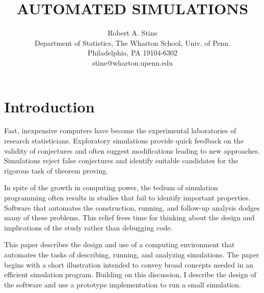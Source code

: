 

\setlength{\leftmargin}{0in}
\setlength{\rightmargin}{0in}
\setlength{\topmargin}{0in}
\setlength{\textheight}{9.in}
\setlength{\headheight}{0in}
\setlength{\headsep}{0in}

\setlength{\columnsep}{0.25in}

\setlength{\abovedisplayskip 0.1in}
\setlength{\belowdisplayskip 0.1in}


\title{AUTOMATED SIMULATIONS}
\author{Robert A. Stine\\
     Department of Statistics, The Wharton School, Univ. of Penn.\\
     Philadelphia, PA  19104-6302\\
		   stine@wharton.upenn.edu}
\date{}
\maketitle


\section{Introduction}

Fast, inexpensive computers have become the experimental laboratories
of research statisticians.  Exploratory simulations provide quick
feedback on the validity of conjectures and often suggest
modifications leading to new approaches. Simulations reject false
conjectures and identify suitable candidates for the rigorous task of
theorem proving. 

In spite of the growth in computing power, the tedium of simulation
programming often results in studies that fail to identify important
properties. Software that automates the construction, running, and
follow-up analysis dodges many of these problems.  This relief frees
time for thinking about the design and implications of the study
rather than debugging code. 

This paper describes the design and use of a computing environment
that automates the tasks of describing, running, and analyzing
simulations.  The paper begins with a short illustration intended to
convey broad concepts needed in an efficient simulation program. 
Building on this discussion, I describe the design of the software
and use a prototype implementation to run a small simulation.

